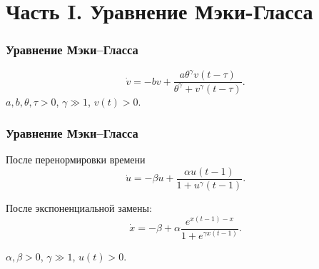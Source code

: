 \section{Часть I. Уравнение Мэки-Гласса}

\begin{frame}
	\frametitle{Уравнение Мэки--Гласса}
	\begin{equation*}
		\label{eq:MG}
		\dot{v}=-b v+\frac{a \theta^{\gamma} v(t-\tau)}{\theta^{\gamma}+v^{\gamma}(t-\tau)}.
	\end{equation*}
	$a, b, \theta, \tau > 0$, $\gamma \gg 1$, $v(t) > 0$.
\end{frame}

\vspace{2em}

\begin{frame}
	\frametitle{Уравнение Мэки--Гласса}
	После перенормировки времени
	\begin{equation*}
		\label{eq:MG_norm}
		\dot{u}=-\beta u + \frac{\alpha u(t - 1)}{1 + u^{\gamma}(t - 1)}.
	\end{equation*}
	
	После экспоненциальной замены:
	\begin{equation}
		\label{eq:MG_x}
		\dot{x}=-\beta+\alpha\frac{e^{x(t-1)-x}}{1 + e^{\gamma x(t-1)}}.
	\end{equation}
	
	$\alpha, \beta > 0$, $\gamma \gg 1$, $u(t) > 0$.
\end{frame}

